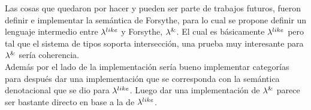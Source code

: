 Las cosas que quedaron por hacer y pueden ser parte de trabajos futuros,
fueron definir e implementar 
la sem\'antica de Forsythe, para lo cual se propone definir un lenguaje 
intermedio entre $\lambda^{like}$ y Forsythe, $\lambda^{\&}$. El cual es b\'asicamente
$\lambda^{like}$ pero tal que el sistema de tipos soporta intersecci\'on, una prueba
muy interesante para $\lambda^{\&}$ ser\'ia coherencia.\\
Adem\'as por el lado de la implementaci\'on ser\'ia bueno implementar categor\'ias
para despu\'es dar una implementaci\'on que se corresponda con la sem\'antica
denotacional que se dio para $\lambda^{like}$. Luego dar una implementaci\'on de 
$\lambda^{\&}$ parece ser bastante directo en base a la de $\lambda^{like}$.
